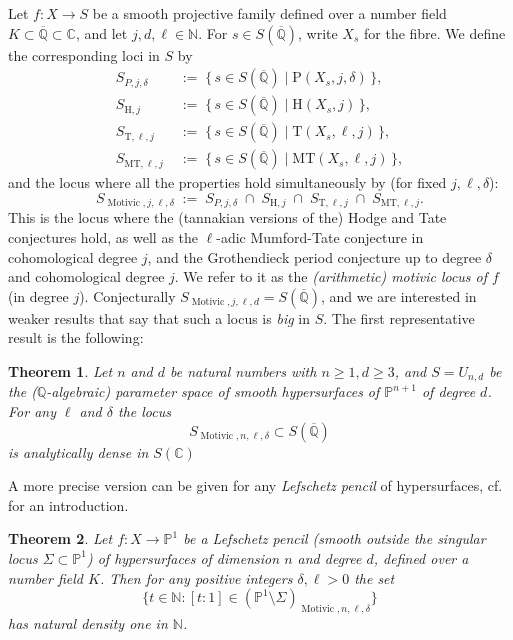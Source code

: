 \documentclass[10pt]{article}
\numberwithin{equation}{section}
\theoremstyle{plain}
\newtheorem{thm}{Theorem}[section]
\theoremstyle{definition}
\theoremstyle{remark}
\newcommand{\C}{\mathbb{C}}
\newcommand{\Qbar}{\overline{\mathbb{Q}}}
\begin{document}
Let $f: X \to S$ be a smooth projective family defined over a number field $K\subset \overline{\mathbb{Q}} \subset \mathbb{C}$, and let $j,d, \ell \in \mathbb{N}$. For $s \in S(\overline{\mathbb{Q}})$, write $X_s$ for the fibre. We define the corresponding loci in $S$ by
\begin{align*}
S_{P,j,\delta} \; &:=\; \{\, s \in S(\overline{\mathbb{Q}}) \mid \mathrm{P}(X_s,j,\delta) \,\},\\
S_{\mathrm{H},j} \; &:=\; \{\, s \in S(\overline{\mathbb{Q}}) \mid \mathrm{H}(X_s,j) \,\}, \\
S_{\mathrm{T},\ell,j} \; &:=\; \{\, s \in S(\overline{\mathbb{Q}}) \mid \mathrm{T}(X_s,\ell,j) \,\}, \\
S_{\mathrm{MT},\ell,j} \; &:=\; \{\, s \in S(\overline{\mathbb{Q}}) \mid \mathrm{MT}(X_s,\ell,j) \,\}, 
\end{align*}
and the locus where all the properties hold simultaneously by (for fixed $j,\ell, \delta$):
\begin{equation}
\label{Smotdef}
S_{\operatorname{Motivic}, j,\ell, \delta} \;:=\;  S_{P,j,\delta}  \;\cap\;S_{\mathrm{H},j} \;\cap\; S_{\mathrm{T},\ell,j} \;\cap\; S_{\mathrm{MT},\ell,j}.
\end{equation}
This is the locus where the (tannakian versions of the) Hodge and  Tate conjectures hold, as well as the $\ell$-adic Mumford-Tate conjecture in cohomological degree $j$, and the Grothendieck period conjecture up to degree $\delta$ and cohomological degree $j$. We refer to it as the \emph{(arithmetic) motivic locus of $f$} (in degree $j$). Conjecturally $S_{\operatorname{Motivic}, j,\ell, d}= S(\Qbar) $, and we are interested in weaker results that say that such a locus is \emph{big} in $S$. The first representative result is the following:

\begin{thm}\label{mainthmhyper}
Let $n$ and $d$ be natural numbers with $n \geq 1, d\geq 3$, and $S=U_{n, d}$ be the ($\mathbb{Q}$-algebraic) parameter space of smooth hypersurfaces of
$\mathbb{P}^{n+1}$ of degree $d$. For any $\ell$ and $\delta$ the locus 
$$S_{\operatorname{Motivic}, n,\ell, \delta}\subset S(\Qbar)$$
is analytically dense in $S(\C)$
\end{thm}

A more precise version can be given for any \emph{Lefschetz pencil} of hypersurfaces, cf. \cite[Exposé XVII]{zbMATH03407568} for an introduction.




\begin{thm}\label{thmLefschetzpen}
Let $f : X \to \mathbb{P}^1$ be a Lefschetz pencil (smooth outside the singular locus $\Sigma \subset \mathbb{P}^1$) of hypersurfaces of dimension $n$ and degree $d$, defined over a number field $K$. Then for any positive integers $\delta, \ell > 0$ the set
\[ \{ t \in \mathbb{N} : [t : 1] \in (\mathbb{P}^1 \setminus \Sigma)_{\operatorname{Motivic},n,\ell,\delta} \} \]
has natural density one in $\mathbb{N}$.
\end{thm}
\end{document}
